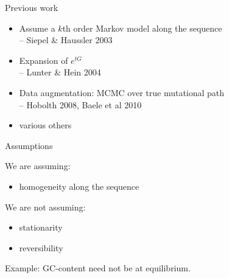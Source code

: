 \documentclass[smaller]{beamer}
\begin{document}
\begin{frame}{Previous work}

  \begin{itemize}

    \item Assume a $k$th order Markov model along the sequence \\
      -- Siepel \& Haussler 2003

    \item Expansion of $e^{tG}$ \\
      -- Lunter \& Hein 2004 

    \item Data augmentation: MCMC over true mutational path \\
      -- Hobolth 2008, Baele et al 2010

    \item various others

  \end{itemize}

\end{frame}

\begin{frame}{Assumptions}

  We are assuming:
  \begin{itemize}

    \item homogeneity along the sequence

  \end{itemize}

  \vspace{2em}

  We are not assuming:
  \begin{itemize}

    \item stationarity

    \item reversibility

  \end{itemize}

  \vspace{2em}

  Example: GC-content need not be at equilibrium.

\end{frame}
\end{document}
